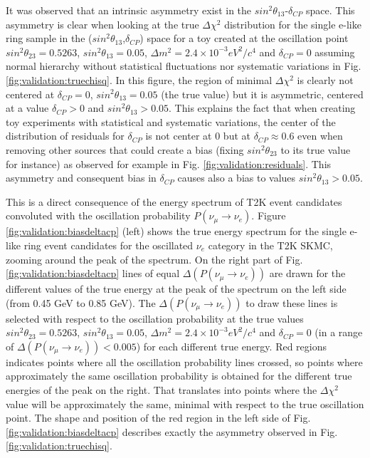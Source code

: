 \begin{itemize}
{It was observed that an intrinsic asymmetry exist in the $sin^{2}\theta_{13}$-$\delta_{CP}$ space. 
This asymmetry is clear when looking at the true $\Delta\chi^{2}$ distribution for the single e-like ring sample
in the ($sin^{2}\theta_{13}$,$\delta_{CP}$) space for a toy created at the oscillation point 
$sin^{2}\theta_{23} = 0.5263$, $sin^{2}\theta_{13} = 0.05$, $\Delta m^{2} = 2.4 \times 10^{-3} eV^{2}/c^{4}$ and $\delta_{CP} = 0$
assuming normal hierarchy without statistical fluctuations nor systematic variations in Fig. \ref{fig:validation:truechisq}. 
In this figure, the region of minimal $\Delta\chi^{2}$ is clearly not centered at  $\delta_{CP} = 0$, $sin^{2}\theta_{13} = 0.05$ (the true value)
but it is asymmetric, centered at a value $\delta_{CP}>0$ and $sin^{2}\theta_{13}>0.05$. 
This explains the fact that when creating toy experiments with statistical and systematic variations, the center of the distribution of
residuals for $\delta_{CP}$ is not center at 0 but at $\delta_{CP}\approx 0.6$ even when removing other sources that could create a bias (fixing $sin^{2}\theta_{23}$ to
its true value for instance) as observed for example in Fig. \ref{fig:validation:residuals}.
This asymmetry and consequent bias in $\delta_{CP}$ causes also a bias to values $sin^{2}\theta_{13}>0.05$.


This is a direct consequence of the energy spectrum of T2K event candidates convoluted with the oscillation probability
$P(\nu_{\mu}\rightarrow\nu_{e})$. Figure \ref{fig:validation:biasdeltacp} (left) shows the true energy spectrum for the single e-like ring
event candidates for the oscillated $\nu_{e}$ category in the T2K SKMC, zooming around the peak of the spectrum. On the right part 
of Fig. \ref{fig:validation:biasdeltacp} lines of equal $\Delta(P(\nu_{\mu}\rightarrow\nu_{e}))$ are drawn for the different values of the true energy
at the peak of the spectrum on the left side (from 0.45 GeV to 0.85 GeV). The $\Delta(P(\nu_{\mu}\rightarrow\nu_{e}))$ to draw these 
lines is selected with respect to the oscillation probability at the true values 
$sin^{2}\theta_{23} = 0.5263$, $sin^{2}\theta_{13} = 0.05$, $\Delta m^{2} = 2.4 \times 10^{-3} eV^{2}/c^{4}$ and $\delta_{CP} = 0$
(in a range of $\Delta(P(\nu_{\mu}\rightarrow\nu_{e})) < 0.005$) for each different true energy. Red regions indicates points where all the oscillation probability 
lines crossed, so points where approximately the same oscillation probability is obtained for the different true energies of the peak 
on the right. That translates into points where the $\Delta\chi^{2}$ value will be approximately the same, minimal with respect to 
the true oscillation point. The shape and position of the red region in the left side of Fig. \ref{fig:validation:biasdeltacp}
describes exactly the asymmetry observed in Fig. \ref{fig:validation:truechisq}. 

}
\end{itemize}
